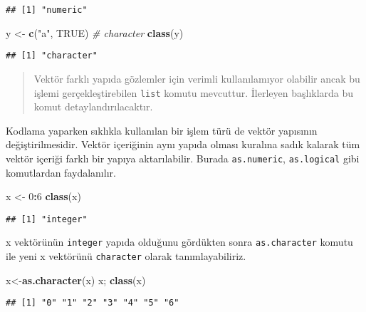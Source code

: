 \documentclass[
]{book}
\newenvironment{Shaded}{\begin{snugshade}}{\end{snugshade}}
\newcommand{\CommentTok}[1]{\textcolor[rgb]{0.56,0.35,0.01}{\textit{#1}}}
\newcommand{\DecValTok}[1]{\textcolor[rgb]{0.00,0.00,0.81}{#1}}
\newcommand{\KeywordTok}[1]{\textcolor[rgb]{0.13,0.29,0.53}{\textbf{#1}}}
\newcommand{\NormalTok}[1]{#1}
\newcommand{\OperatorTok}[1]{\textcolor[rgb]{0.81,0.36,0.00}{\textbf{#1}}}
\newcommand{\OtherTok}[1]{\textcolor[rgb]{0.56,0.35,0.01}{#1}}
\newcommand{\StringTok}[1]{\textcolor[rgb]{0.31,0.60,0.02}{#1}}
\begin{document}
\begin{verbatim}
## [1] "numeric"
\end{verbatim}

\begin{Shaded}
\begin{Highlighting}[]
\NormalTok{y <-}\StringTok{ }\KeywordTok{c}\NormalTok{(}\StringTok{"a"}\NormalTok{, }\OtherTok{TRUE}\NormalTok{) }\CommentTok{# character}
\KeywordTok{class}\NormalTok{(y)}
\end{Highlighting}
\end{Shaded}

\begin{verbatim}
## [1] "character"
\end{verbatim}

\begin{quote}
Vektör farklı yapıda gözlemler için verimli kullanılamıyor olabilir ancak bu işlemi gerçekleştirebilen \texttt{list} komutu mevcuttur. İlerleyen başlıklarda bu komut detaylandırılacaktır.
\end{quote}

Kodlama yaparken sıklıkla kullanılan bir işlem türü de vektör yapısının değiştirilmesidir. Vektör içeriğinin aynı yapıda olması kuralına sadık kalarak tüm vektör içeriği farklı bir yapıya aktarılabilir. Burada \texttt{as.numeric}, \texttt{as.logical} gibi komutlardan faydalanılır.

\begin{Shaded}
\begin{Highlighting}[]
\NormalTok{x <-}\StringTok{ }\DecValTok{0}\OperatorTok{:}\DecValTok{6}
\KeywordTok{class}\NormalTok{(x)}
\end{Highlighting}
\end{Shaded}

\begin{verbatim}
## [1] "integer"
\end{verbatim}

x vektörünün \texttt{integer} yapıda olduğunu gördükten sonra \texttt{as.character} komutu ile yeni x vektörünü \texttt{character} olarak tanımlayabiliriz.

\begin{Shaded}
\begin{Highlighting}[]
\NormalTok{x<-}\KeywordTok{as.character}\NormalTok{(x)}
\NormalTok{x; }\KeywordTok{class}\NormalTok{(x)}
\end{Highlighting}
\end{Shaded}

\begin{verbatim}
## [1] "0" "1" "2" "3" "4" "5" "6"
\end{verbatim}
\end{document}
